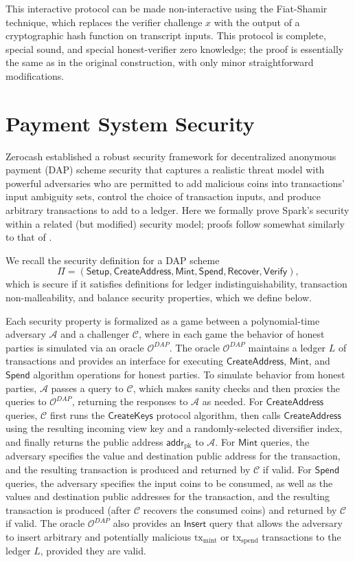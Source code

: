 \documentclass{llncs}
\newcommand{\func}[1]{\mathsf{#1}}
\newcommand{\addr}{\func{addr}}
\begin{document}
This interactive protocol can be made non-interactive using the Fiat-Shamir technique, which replaces the verifier challenge $x$ with the output of a cryptographic hash function on transcript inputs.
This protocol is complete, special sound, and special honest-verifier zero knowledge; the proof is essentially the same as in the original construction, with only minor straightforward modifications.


\section{Payment System Security}
\label{app:security}
 
Zerocash \cite{zerocash} established a robust security framework for decentralized anonymous payment (DAP) scheme security that captures a realistic threat model with powerful adversaries who are permitted to add malicious coins into transactions' input ambiguity sets, control the choice of transaction inputs, and produce arbitrary transactions to add to a ledger.
Here we formally prove Spark's security within a related (but modified) security model; proofs follow somewhat similarly to that of \cite{zerocash}.

We recall the security definition for a DAP scheme $$\Pi = (\func{Setup}, \func{CreateAddress}, \func{Mint}, \func{Spend}, \func{Recover}, \func{Verify}),$$ which is secure if it satisfies definitions for ledger indistinguishability, transaction non-malleability, and balance security properties, which we define below.

Each security property is formalized as a game between a polynomial-time adversary $\mathcal{A}$ and a challenger $\mathcal{C}$, where in each game the behavior of honest parties is simulated via an oracle $\mathcal{O}^{DAP}$.
The oracle $\mathcal{O}^{DAP}$ maintains a ledger $L$ of transactions and provides an interface for executing $\func{CreateAddress}$, $\func{Mint}$, and $\func{Spend}$ algorithm operations for honest parties.
To simulate behavior from honest parties, $\mathcal{A}$ passes a query to $\mathcal{C}$, which makes sanity checks and then proxies the queries to $\mathcal{O}^{DAP}$, returning the responses to $\mathcal{A}$ as needed.
For $\func{CreateAddress}$ queries, $\mathcal{C}$ first runs the $\func{CreateKeys}$ protocol algorithm, then calls $\func{CreateAddress}$ using the resulting incoming view key and a randomly-selected diversifier index, and finally returns the public address $\addr_{\text{pk}}$ to $\mathcal{A}$.
For $\func{Mint}$ queries, the adversary specifies the value and destination public address for the transaction, and the resulting transaction is produced and returned by $\mathcal{C}$ if valid.
For $\func{Spend}$ queries, the adversary specifies the input coins to be consumed, as well as the values and destination public addresses for the transaction, and the resulting transaction is produced (after $\mathcal{C}$ recovers the consumed coins) and returned by $\mathcal{C}$ if valid.
The oracle $\mathcal{O}^{DAP}$ also provides an $\func{Insert}$ query that allows the adversary to insert arbitrary and potentially malicious $\text{tx}_{\text{mint}}$ or $\text{tx}_{\text{spend}}$ transactions to the ledger $L$, provided they are valid.
\end{document}
